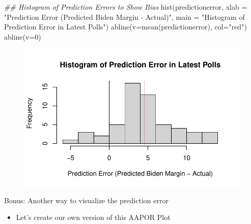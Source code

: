 \documentclass[
  letterpaper,
  DIV=11,
  numbers=noendperiod]{scrreprt}
\newenvironment{Shaded}{\begin{snugshade}}{\end{snugshade}}
\newcommand{\AttributeTok}[1]{\textcolor[rgb]{0.40,0.45,0.13}{#1}}
\newcommand{\DecValTok}[1]{\textcolor[rgb]{0.68,0.00,0.00}{#1}}
\newcommand{\DocumentationTok}[1]{\textcolor[rgb]{0.37,0.37,0.37}{\textit{#1}}}
\newcommand{\FunctionTok}[1]{\textcolor[rgb]{0.28,0.35,0.67}{#1}}
\newcommand{\NormalTok}[1]{\textcolor[rgb]{0.00,0.23,0.31}{#1}}
\newcommand{\StringTok}[1]{\textcolor[rgb]{0.13,0.47,0.30}{#1}}
\providecommand{\tightlist}{%
  \setlength{\itemsep}{0pt}\setlength{\parskip}{0pt}}\usepackage{longtable,booktabs,array}
\begin{document}
\begin{Shaded}
\begin{Highlighting}[]
\DocumentationTok{\#\# Histogram of Prediction Errors to Show Bias}
\FunctionTok{hist}\NormalTok{(predictionerror, }
     \AttributeTok{xlab =} \StringTok{"Prediction Error (Predicted Biden Margin {-} Actual)"}\NormalTok{,}
     \AttributeTok{main =} \StringTok{"Histogram of Prediction Error in Latest Polls"}\NormalTok{)}
\FunctionTok{abline}\NormalTok{(}\AttributeTok{v=}\FunctionTok{mean}\NormalTok{(predictionerror), }\AttributeTok{col=}\StringTok{"red"}\NormalTok{)}
\FunctionTok{abline}\NormalTok{(}\AttributeTok{v=}\DecValTok{0}\NormalTok{)}
\end{Highlighting}
\end{Shaded}

\begin{figure}[H]

{\centering \includegraphics{07-Prediction_files/figure-pdf/unnamed-chunk-15-1.pdf}

}

\end{figure}

Bonus: Another way to visualize the prediction error

\begin{itemize}
\tightlist
\item
  Let's create our own version of this AAPOR Plot
\end{itemize}
\end{document}
